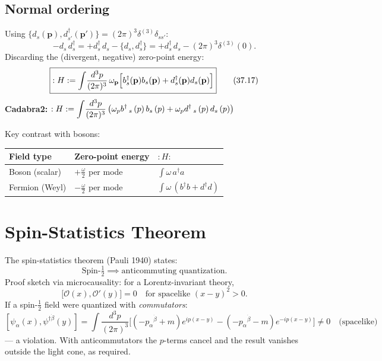 \documentclass[12pt]{article}
\newcommand{\omegap}{\omega_{\mathbf{p}}}
\begin{document}
\subsection{Normal ordering}

Using $\{d_s(\mathbf{p}),d^\dagger_{s'}(\mathbf{p}')\} = (2\pi)^3\delta^{(3)}\delta_{ss'}$:
\begin{equation}
  -d_s\,d^\dagger_s = +d^\dagger_s\,d_s - \{d_s,d^\dagger_s\}
  = +d^\dagger_s\,d_s - (2\pi)^3\delta^{(3)}(0).
\end{equation}
Discarding the (divergent, negative) zero-point energy:
\begin{equation}
  \boxed{:H: = \int\!\frac{d^3p}{(2\pi)^3}\,\omegap
  \Bigl[b^\dagger_s(\mathbf{p})b_s(\mathbf{p}) + d^\dagger_s(\mathbf{p})d_s(\mathbf{p})\Bigr]}
  \tag{37.17}
\end{equation}
\textbf{Cadabra2:} $:H: = \displaystyle\int\!\frac{d^3p}{(2\pi)^3}\,\bigl(\omega_{p} b^{\dagger}\,_{s}\left(p\right) b_{s}\left(p\right)\discretionary{}{}{}+\omega_{p} d^{\dagger}\,_{s}\left(p\right) d_{s}\left(p\right)\bigr)$

\medskip
Key contrast with bosons:
\begin{center}
\renewcommand{\arraystretch}{1.4}
\begin{tabular}{@{}lll@{}}
  \toprule
  Field type & Zero-point energy & $:H:$ \\
  \midrule
  Boson (scalar) & $+\frac{\omega}{2}$ per mode & $\int\omega\,a^\dagger a$ \\
  Fermion (Weyl) & $-\frac{\omega}{2}$ per mode & $\int\omega\,(b^\dagger b + d^\dagger d)$ \\
  \bottomrule
\end{tabular}
\end{center}

\section{Spin-Statistics Theorem}

The spin-statistics theorem (Pauli 1940) states:
\begin{equation}
  \text{Spin-}\tfrac{1}{2} \implies \text{anticommuting quantization}.
\end{equation}
Proof sketch via microcausality: for a Lorentz-invariant theory,
\[
  \bigl[\mathcal{O}(x),\mathcal{O}'(y)\bigr] = 0
  \quad\text{for spacelike }(x-y)^2>0.
\]
If a spin-$\frac{1}{2}$ field were quantized with \emph{commutators}:
\[
  [\psi_\alpha(x),\psi^{\dagger\dot\beta}(y)] = \int\!\frac{d^3p}{(2\pi)^3}
  \bigl[(-p_{\alpha}{}^{\dot\beta}+m)e^{ip(x-y)}
       -(-p_{\alpha}{}^{\dot\beta}-m)e^{-ip(x-y)}\bigr]
  \neq 0\quad\text{(spacelike)}
\]
--- a violation.  With anticommutators the $p$-terms cancel and the result
vanishes outside the light cone, as required.
\end{document}
